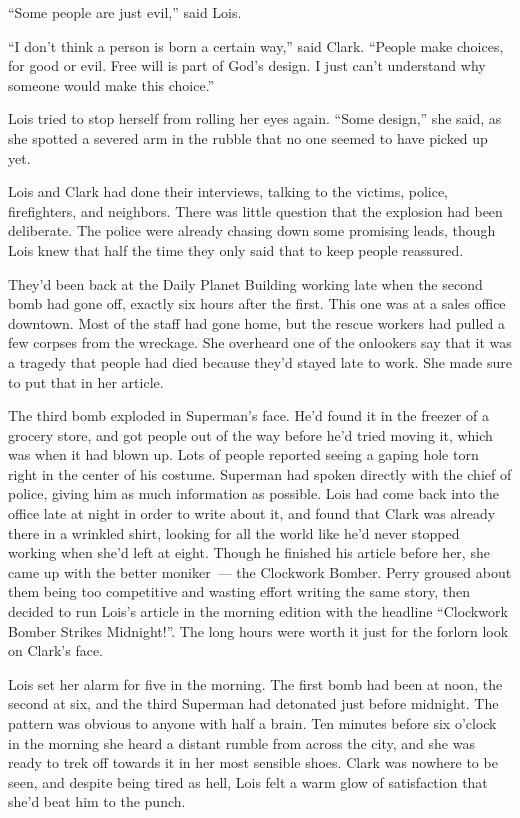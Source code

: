 ``Some people are just evil,'' said Lois.

``I don't think a person is born a certain way,'' said Clark. ``People
make choices, for good or evil. Free will is part of God's design. I
just can't understand why someone would make this choice.''

Lois tried to stop herself from rolling her eyes again. ``Some design,''
she said, as she spotted a severed arm in the rubble that no one seemed
to have picked up yet.

Lois and Clark had done their interviews, talking to the victims,
police, firefighters, and neighbors. There was little question that the
explosion had been deliberate. The police were already chasing down some
promising leads, though Lois knew that half the time they only said that
to keep people reassured.

They'd been back at the Daily Planet Building working late when the
second bomb had gone off, exactly six hours after the first. This one
was at a sales office downtown. Most of the staff had gone home, but the
rescue workers had pulled a few corpses from the wreckage. She overheard
one of the onlookers say that it was a tragedy that people had died
because they'd stayed late to work. She made sure to put that in her
article.

The third bomb exploded in Superman's face. He'd found it in the freezer
of a grocery store, and got people out of the way before he'd tried
moving it, which was when it had blown up. Lots of people reported
seeing a gaping hole torn right in the center of his costume. Superman
had spoken directly with the chief of police, giving him as much
information as possible. Lois had come back into the office late at
night in order to write about it, and found that Clark was already there
in a wrinkled shirt, looking for all the world like he'd never stopped
working when she'd left at eight. Though he finished his article before
her, she came up with the better moniker~--- the Clockwork Bomber. Perry
groused about them being too competitive and wasting effort writing the
same story, then decided to run Lois's article in the morning edition
with the headline ``Clockwork Bomber Strikes Midnight!''. The long hours
were worth it just for the forlorn look on Clark's face.

Lois set her alarm for five in the morning. The first bomb had been at
noon, the second at six, and the third Superman had detonated just
before midnight. The pattern was obvious to anyone with half a brain.
Ten minutes before six o'clock in the morning she heard a distant rumble
from across the city, and she was ready to trek off towards it in her
most sensible shoes. Clark was nowhere to be seen, and despite being
tired as hell, Lois felt a warm glow of satisfaction that she'd beat him
to the punch.


